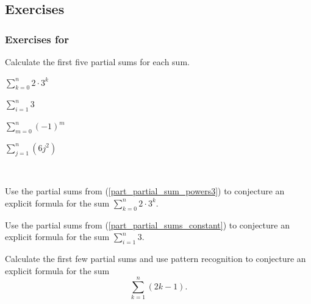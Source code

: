 
\subsection{Exercises}


\subsubsection*{Exercises for  \subsumconj}

\begin{exer}[\exerP] %
\label{exer_partial_sums}
    Calculate the first five partial sums for each sum.
        \begin{exerpart}
            \item \label{part_partial_sum_powers3} $\displaystyle \sum_{k=0}^n2 \cdot 3^k$
            \item \label{part_partial_sums_constant} $\displaystyle \sum_{i=1}^{n}3$
            \item \label{part_partial_sums_alt} $\displaystyle \sum_{m=0}^{n}(-1)^m$ %
            \item \label{part_partial_sums_square} $\displaystyle \sum_{j=1}^{n}(6j^2)$
        \end{exerpart}  
\end{exer}

\begin{exer}[\exerP] %
\label{exer_sum_conj_powers3_constant}
~ 
    \begin{exerpart}
        \item Use the partial sums from  (\ref{part_partial_sum_powers3}) to conjecture an explicit formula for the sum $\displaystyle \sum_{k=0}^n2 \cdot 3^k$.
          
        \item Use the partial sums from  (\ref{part_partial_sums_constant}) to conjecture an explicit formula for the sum $\displaystyle \sum_{i=1}^{n}3$.           
    \end{exerpart}
\end{exer}

\begin{exer}[\exerP] %
\label{exer_sum_conj_odds}
    Calculate the first few partial sums and use pattern recognition to conjecture an explicit formula for the sum 
        $$\displaystyle \sum_{k=1}^n(2k-1).$$
\end{exer}

